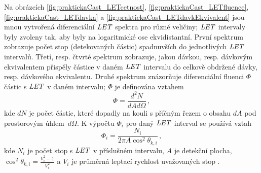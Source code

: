 Na obrázcích \ref{fig:praktickaCast_LETcetnost}, \ref{fig:praktickaCast_LETfluence}, \ref{fig:praktickaCast_LETdavka} a \ref{fig:praktickaCast_LETdavkEkvivalent} jsou mnou vytvořená diferenciální $\mathit{LET}$ spektra pro různé veličiny; $\mathit{LET}$ intervaly byly zvoleny tak, aby byly na logaritmické ose ekvidistantní. První spektrum zobrazuje počet stop (detekovaných částic) spadnuvších do jednotlivých $\mathit{LET}$ intervalů. Třetí, resp. čtvrté spektrum zobrazuje, jakou dávkou, resp. dávkovým ekvivalentem přispěly částice v daném $\mathit{LET}$ intervalu do celkově obdržené dávky, resp. dávkového ekvivalentu. Druhé spektrum znázorňuje diferenciální fluenci $\Phi$ částic s $\mathit{LET}$ v daném intervalu; $\Phi$ je definována vztahem
\begin{equation}
  \Phi=\frac{d^2N}{dAd\Omega}\,,
  \label{eq:praktickaCast_fluence}
\end{equation}
kde $dN$ je počet částic, které dopadly na kouli s příčným řezem o obsahu $dA$ pod prostorovým úhlem~$d\Omega$. K výpočtu $\Phi_i$ pro daný $\mathit{LET}$ interval se používá vztah
\begin{equation}
  \Phi_i=\frac{N_i}{2\pi A\cos^2\theta_{k,i}}\,,
  \label{eq:praktickaCast_fluenceVypocet}
\end{equation}
kde $N_i$ je počet stop s $\mathit{LET}$ v příslušném intervalu, $A$ je detekční plocha, $\cos^2\theta_{k,i}=\frac{V^2_i-1}{V^2_i}$ a $V_i$ je průměrná leptací rychlost uvažovaných stop \cite{ssntd}.

